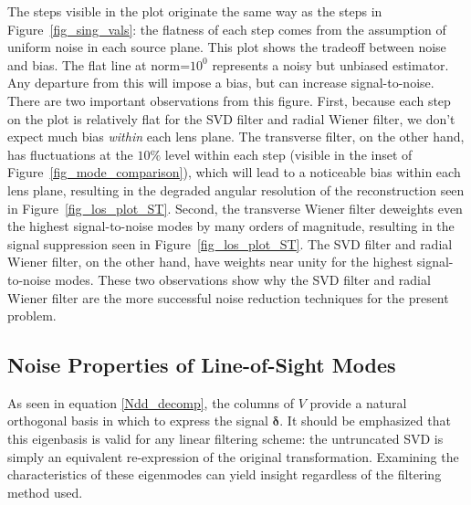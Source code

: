 \documentclass[twocolumn]{emulateapj}
\newcommand{\myvec}[1]{\boldsymbol{#1}}
\newcommand{\mymat}[1]{#1}
\begin{document}
The steps visible in the plot originate the same way as the steps in
Figure~\ref{fig_sing_vals}: the flatness of each step comes from the 
assumption of uniform noise in each source plane.  This plot shows 
the tradeoff between noise and bias.  The flat line at norm=$10^0$ 
represents a noisy but unbiased estimator.  Any departure
from this will impose a bias, but can increase signal-to-noise.
There are two important observations from this figure.
First, because each step on the plot is relatively flat for
the SVD filter and radial Wiener filter, we don't expect much bias 
\textit{within} each lens plane.  
The transverse filter, on the other hand, has fluctuations
at the $10\%$ level within each step (visible in the inset of 
Figure~\ref{fig_mode_comparison}), which will lead to a noticeable bias
within each lens plane, resulting in the degraded angular resolution
of the reconstruction seen in Figure~\ref{fig_los_plot_ST}.
Second, the transverse Wiener filter deweights even the highest 
signal-to-noise modes by many orders of magnitude, resulting 
in the signal suppression seen in Figure~\ref{fig_los_plot_ST}.
The SVD filter and radial Wiener filter, on the other hand,
have weights near unity for the highest signal-to-noise modes.
These two observations show why the SVD filter and radial Wiener filter 
are the more successful noise reduction techniques for the present problem.

\begin{figure*}[t]
 \centering
 \caption{Contribution of each shear mode to the reconstruction
 for three different filters.  The dotted line at $10^0$ represents the
 unfiltered result.  Each filtering method leads to a different
 weighting of the shear modes.  The SVD filter, by design, completely 
 removes higher-order modes beyond a given cutoff, while the Wiener 
 filter deweights modes in a more gradual fashion.
 Note that the transverse Weiner filter deweights
 all modes by up to seven orders of magnitude; it has been scaled by
 a factor of $10^4$ for this plot.  The inset plot shows a
 closeup of the fluctuations within each ``step'' of the transverse
 filter.  These fluctuations lead to angular spread in the response
 (see discussion in Section~\ref{Comparison})
 \label{fig_mode_comparison} }
\end{figure*}

\subsection{Noise Properties of Line-of-Sight Modes}
\label{SN_modes}
As seen in equation \ref{Ndd_decomp}, the columns of $\mymat{V}$ provide
a natural orthogonal basis in which to express the signal $\myvec{\delta}$.  
It should be emphasized that this eigenbasis is 
valid for any linear filtering scheme: the untruncated
SVD is simply an equivalent re-expression of the original transformation.
Examining the characteristics of these eigenmodes can yield insight
regardless of the filtering method used.
\end{document}
